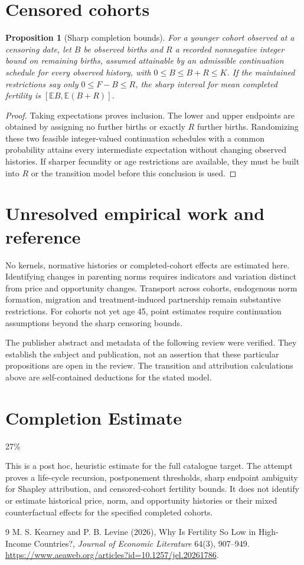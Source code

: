 \documentclass[11pt]{article}
\newtheorem{proposition}[theorem]{Proposition}
\theoremstyle{remark}\newtheorem{remark}[theorem]{Remark}
\newcommand{\E}{\mathbb E}
\begin{document}
\section*{Censored cohorts}
\begin{proposition}[Sharp completion bounds]
For a younger cohort observed at a censoring date, let $B$ be observed births and $R$ a recorded nonnegative integer bound on remaining births, assumed attainable by an admissible continuation schedule for every observed history, with $0\le B\le B+R\le K$. If the maintained restrictions say only $0\le F-B\le R$, the sharp interval for mean completed fertility is $[\E B,\E(B+R)]$.
\end{proposition}
\begin{proof}
Taking expectations proves inclusion. The lower and upper endpoints are obtained by assigning no further births or exactly $R$ further births. Randomizing these two feasible integer-valued continuation schedules with a common probability attains every intermediate expectation without changing observed histories. If sharper fecundity or age restrictions are available, they must be built into $R$ or the transition model before this conclusion is used.
\end{proof}

\section*{Unresolved empirical work and reference}
No kernels, normative histories or completed-cohort effects are estimated here. Identifying changes in parenting norms requires indicators and variation distinct from price and opportunity changes. Transport across cohorts, endogenous norm formation, migration and treatment-induced partnership remain substantive restrictions. For cohorts not yet age 45, point estimates require continuation assumptions beyond the sharp censoring bounds.

The publisher abstract and metadata of the following review were verified. They establish the subject and publication, not an assertion that these particular propositions are open in the review. The transition and attribution calculations above are self-contained deductions for the stated model.

\section{Completion Estimate}
27\%

This is a post hoc, heuristic estimate for the full catalogue target.
The attempt proves a life-cycle recursion, postponement thresholds, sharp endpoint ambiguity for Shapley attribution, and censored-cohort fertility bounds. It does not identify or estimate historical price, norm, and opportunity histories or their mixed counterfactual effects for the specified completed cohorts.

\begin{thebibliography}{9}
 M. S. Kearney and P. B. Levine (2026), Why Is Fertility So Low in High-Income Countries?, \emph{Journal of Economic Literature} 64(3), 907--949. \url{https://www.aeaweb.org/articles?id=10.1257/jel.20261786}.
\end{thebibliography}
\end{document}
